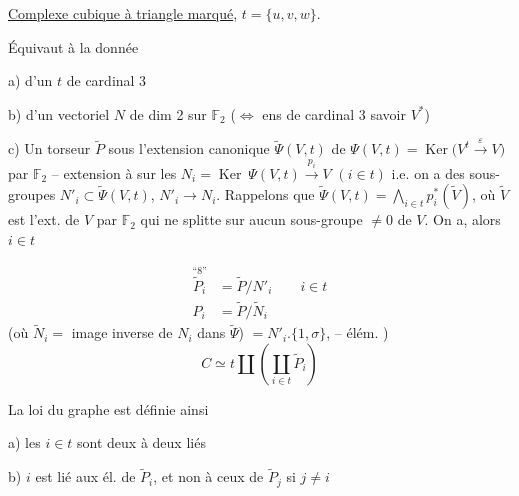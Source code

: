 \uline{Complexe cubique à triangle  marqué}, $t=\{u,v,w\}$.

Équivaut à la donnée

a) d'un  $t$ de cardinal 3

b) d'un vectoriel $N$ de dim 2 sur $\mathbb F_2$ ($\Longleftrightarrow$ ens de cardinal 3 savoir $V^*$)

c) Un torseur $\widetilde P$ sous l'extension canonique
$\widetilde\Psi(V,t)$ de $\Psi(V,t)=\operatorname{Ker}\bigl(V^t\overset{\varepsilon}{\longrightarrow}V\bigr)$ par $\mathbb F_2$  -- extension à   sur les $N_i=\operatorname{Ker}\ \Psi(V,t)\overset{p_i}{\longrightarrow}V$ $(i\in t)$ i.e. on a des sous-groupes $N'_i\subset\widetilde\Psi(V,t)$, $N'_i\longrightarrow N_i$. Rappelons que $\widetilde\Psi(V,t)=\bigwedge_{i\in t}p_i^*(\widetilde V)$, où $\widetilde V$ est l'ext. de $V$ par $\mathbb F_2$ qui ne splitte sur aucun sous-groupe $\ne0$ de $V$. On a, alors  $i\in t$

\[
\begin{aligned}
\overset{\text{``8''}}{\widetilde P_i}&=\widetilde P/N'_i\qquad i\in t\\
P_i&=\widetilde P/\widetilde N_i
\end{aligned}
\]
(où $\widetilde N_i=$ image inverse de $N_i$ dans $\widetilde\Psi$) $=N'_i.\{1,\sigma\}$, \unsure{$\sigma$} -- élém.  )
\[
C\simeq t\amalg\left(\coprod_{i\in t}\widetilde P_i\right)
\]

La loi du graphe est définie ainsi

a) les $i\in t$ sont deux à deux liés

b) $i$ est lié aux él. de $\widetilde P_i$, et non à ceux de $\widetilde P_j$ si $j\ne i$

